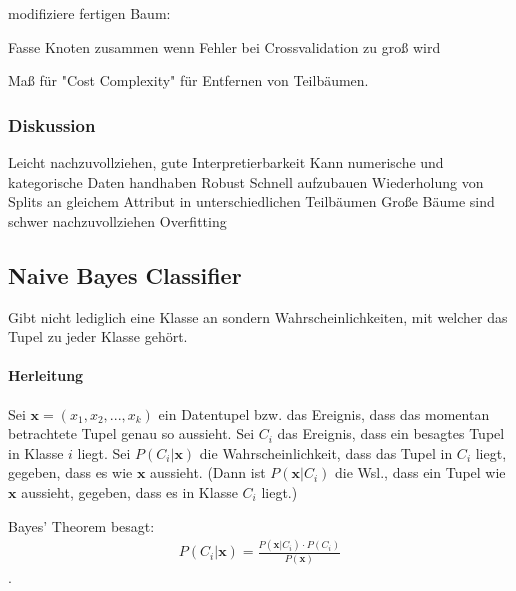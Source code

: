 \documentclass[10pt]{article} %
\begin{document}
\begin{definition} modifiziere fertigen Baum:
\begin{cptitemize} 
      \item Fasse Knoten zusammen wenn Fehler bei Crossvalidation zu groß wird
      \item Maß für "Cost Complexity" für Entfernen von Teilbäumen.
 \end{cptitemize}  
\end{definition} 

\subsubsection{Diskussion}
\begin{itemize}
         \advantageit Leicht nachzuvollziehen, gute Interpretierbarkeit
         \advantageit Kann numerische und kategorische Daten handhaben
         \advantageit Robust
         \advantageit Schnell aufzubauen
         \disadvantageit Wiederholung von Splits an gleichem Attribut in
         unterschiedlichen Teilbäumen
         \disadvantageit Große Bäume sind schwer nachzuvollziehen
         \disadvantageit Overfitting
\end{itemize}



\subsection{Naive Bayes Classifier}

Gibt nicht lediglich eine Klasse an sondern Wahrscheinlichkeiten, mit welcher das Tupel zu jeder Klasse gehört.

\renewcommand{\vec}[1]{\boldsymbol{#1}}
\newcommand{\hypoth}{H}

\paragraph{Herleitung} 
   Sei $\vec{x} = (x_1, x_2, ..., x_k)$ ein Datentupel bzw. das Ereignis, dass
   das momentan betrachtete Tupel genau so aussieht. Sei $C_i$ das Ereignis,
   dass ein besagtes Tupel in Klasse $i$ liegt. Sei $P(C_i|\vec{x})$ die
   Wahrscheinlichkeit, dass das Tupel in $C_i$ liegt, gegeben, dass es wie
   $\vec{x}$ aussieht. (Dann ist $P(\vec{x}|C_i)$ die Wsl., dass ein Tupel wie
   $\vec{x}$ aussieht, gegeben, dass es in Klasse $C_i$ liegt.)
   
   Bayes' Theorem besagt:
   \begin{align*} 
       P(C_i|\vec{x}) = \frac{P(\vec{x}|C_i) \cdot P(C_i)}{P(\vec{x})}
   \end{align*} 
   .
\end{document}
